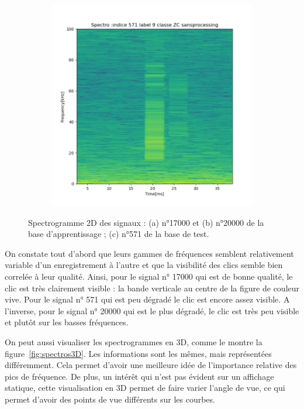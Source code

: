 \begin{figure}[!h]
\begin{subfigure}[b]{0.3\textwidth}
    \caption{}
  \end{subfigure}
  \begin{subfigure}[b]{0.3\textwidth}
    \includegraphics[width=\textwidth]{./images/indice571Spectro2Dlabel9classeZCsansprocessingsanszoom.png}
    \caption{}
  \end{subfigure}
  \caption{Spectrogramme 2D des signaux : (a) n°17000 et (b) n°20000 de la base d'apprentissage ; (c) n°571 de la base de test.%
  \label{fig:spectros2D}}
\end{figure}

On constate tout d'abord  que leurs gammes de fréquences semblent relativement variable d'un enregistrement à l'autre et que la visibilité des clics semble bien correlée à leur qualité.
Ainsi, pour le signal n° 17000 qui est de bonne qualité, le clic est très clairement visible : la bande verticale au centre de la figure de couleur vive.
Pour le signal n° 571 qui est peu dégradé le clic est encore assez visible.
A l'inverse, pour le signal n° 20000 qui est le plus dégradé, le clic est très peu visible et plutôt sur les basses fréquences.

On peut aussi visualiser les spectrogrammes en 3D, comme le montre la figure~\ref{fig:spectros3D}.
Les informations sont les mêmes, mais représentées différemment.
Cela permet d'avoir une meilleure idée de l'importance relative des pics de fréquence.
De plus, un intérêt qui n'est pas évident sur un affichage statique, cette visualisation en 3D permet de faire varier l'angle de vue, ce qui permet d'avoir des points de vue différents sur les courbes.


